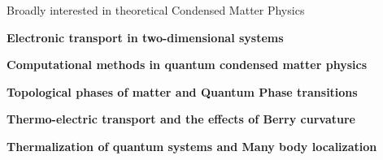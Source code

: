 

\begin{cventries}

  \cventry
    {} %
    {Broadly interested in theoretical Condensed Matter Physics} %
    {} %
    {} %
    {
      \begin{cvitems} %
      	\item {\textbf{Electronic transport in two-dimensional systems}}
        \item {\textbf{Computational methods in quantum condensed matter physics}}
        \item {\textbf{Topological phases of matter and Quantum Phase transitions}}
        \item {\textbf{Thermo-electric transport and the effects of Berry curvature}}
        \item {\textbf{Thermalization of quantum systems and Many body localization}}
      \end{cvitems}
    }

\end{cventries}
